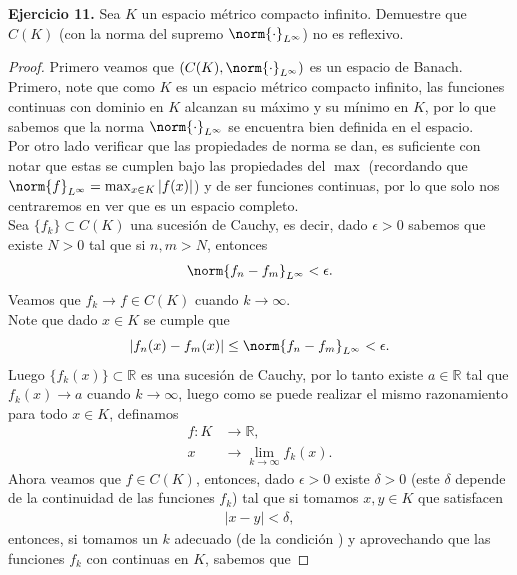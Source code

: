 

\textbf{Ejercicio 11.} Sea $K$ un espacio métrico compacto infinito. Demuestre que $C(K)$ (con la norma del supremo $\norm{\cdot}_{L^\infty}$) no es reflexivo.
\begin{proof}
  Primero veamos que $(C(K),\norm{\cdot}_{L^{\infty}})$ es un espacio de Banach.\\
  Primero, note que como $K$ es un espacio métrico compacto infinito, las funciones continuas con dominio en $K$ alcanzan su máximo y su mínimo en $K$, por lo que sabemos que la norma $\norm{\cdot}_{L^{\infty}}$ se encuentra bien definida en el espacio.\\
  Por otro lado verificar que las propiedades de norma se dan, es suficiente con notar que estas se cumplen bajo las propiedades del $\max$ (recordando que $\norm{f}_{L^{\infty}}=\max_{x\in K}|f(x)|$) y de ser funciones continuas, por lo que solo nos centraremos en ver que es un espacio completo.\\
  Sea $\{f_{k}\}\subset C(K)$ una sucesión de Cauchy, es decir, dado $\epsilon>0$ sabemos que existe $N>0$ tal que si $n,m>N$, entonces
  \begin{align*}
    \norm{f_{n}-f_{m}}_{L^{\infty}}<\epsilon.
  \end{align*}
  Veamos que $f_{k}\to f\in C(K)$ cuando $k\to\infty$.\\
  Note que dado $x\in K$ se cumple que
  \begin{equation*}\label{eq:puntual-f}
    |f_{n}(x)-f_{m}(x)|\leq \norm{f_{n}-f_{m}}_{L^\infty}<\epsilon. 
  \end{equation*}
  Luego $\{f_{k}(x)\}\subset \mathbb{R}$ es una sucesión de Cauchy, por lo tanto existe $a\in \mathbb{R}$ tal que $f_{k}(x)\to a$ cuando $k\to \infty$, luego como se puede realizar el mismo razonamiento para todo $x\in K$, definamos
  \begin{align*}
    f:K&\to \mathbb{R},\\
      x&\to\lim_{k \to \infty}f_{k}(x).
  \end{align*}
  Ahora veamos que $f\in C(K)$, entonces, dado $\epsilon>0$ existe $\delta>0$ (este $\delta$ depende de la continuidad de las funciones $f_{k}$) tal que si tomamos $x,y\in K$ que satisfacen
  \begin{align*}
    |x-y|<\delta,
  \end{align*}
  entonces, si tomamos un $k$ adecuado (de la condición $\label{eq:puntual-f}$) y aprovechando que las funciones $f_{k}$ con continuas en $K$, sabemos que

\end{proof}
